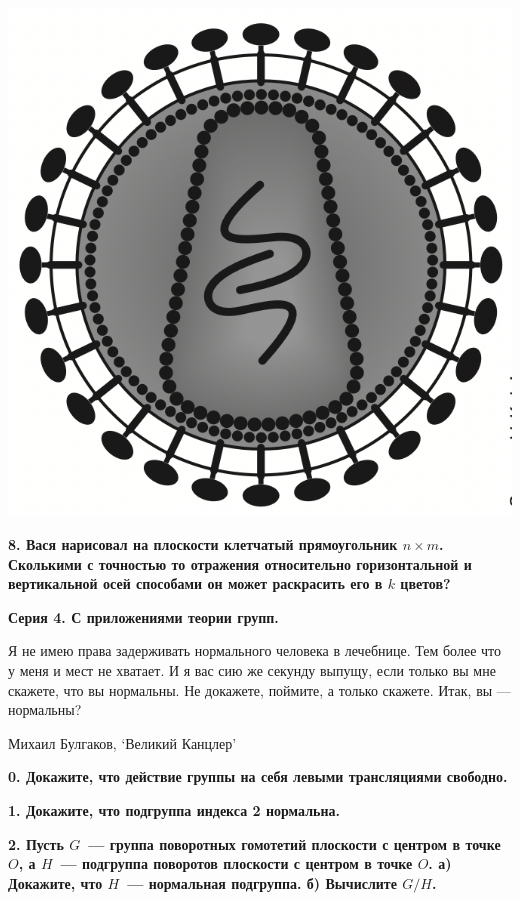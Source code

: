 \documentclass[10pt]{article}
\begin{document}
\begin{landscape}
\begin{multicols}{2}
	\begin{center}
		\includegraphics[scale = 0.3]{pic/pic_3.png}
	\end{center}

	\bf{8.} Вася нарисовал на  плоскости  клетчатый прямоугольник $n \times m$. Сколькими  с точностью то отражения относительно горизонтальной и вертикальной осей способами он может раскрасить его в $k$ цветов?

	

	\columnbreak

	
	\centerline{\bf{Серия 4. С приложениями теории групп.}}

	\epigraph{Я не имею права задерживать нормального человека в лечебнице. Тем более что у меня и мест не хватает. И я вас сию же секунду выпущу, если только вы мне скажете, что вы нормальны. Не докажете, поймите, а только скажете. Итак, вы — нормальны?}{Михаил Булгаков, ‘Великий Канцлер’}

	\bf{0.} Докажите, что действие группы на себя левыми трансляциями свободно.  

	\bf{1.} Докажите, что подгруппа индекса 2 нормальна. 

	\bf{2.} Пусть $G$~--- группа поворотных гомотетий плоскости с центром в точке $O$, а $H$~--- подгруппа поворотов плоскости с центром в точке $O$. а) Докажите, что $H$~--- нормальная подгруппа. б) Вычислите $G/H$.


\end{multicols}
\end{landscape}
\end{document}
